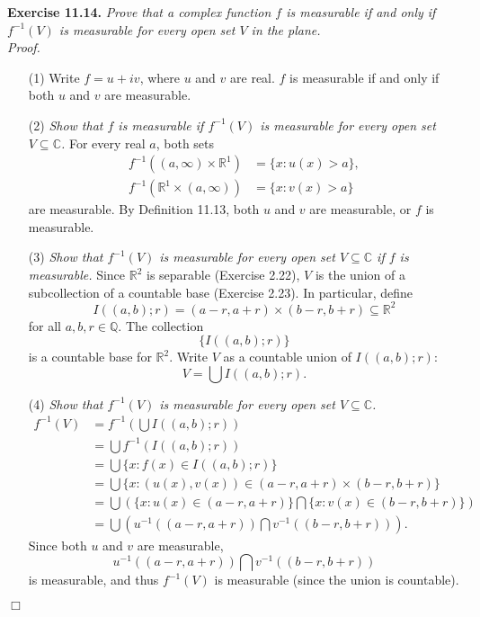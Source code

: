 \documentclass{article}
\begin{document}



\textbf{Exercise 11.14.}
\emph{Prove that a complex function $f$ is measurable
if and only if $f^{-1}(V)$ is measurable for every open set $V$ in the plane.} \\

\emph{Proof.}
\begin{enumerate}
\item[(1)]
  Write $f=u+iv$, where $u$ and $v$ are real.
  $f$ is measurable if and only if both $u$ and $v$ are measurable.

\item[(2)]
  \emph{Show that $f$ is measurable
  if $f^{-1}(V)$ is measurable for every open set $V \subseteq \mathbb{C}$.}
  For every real $a$,
  both sets
  \begin{align*}
    f^{-1}((a,\infty) \times \mathbb{R}^1) &= \{ x : u(x) > a \}, \\
    f^{-1}(\mathbb{R}^1 \times (a,\infty)) &= \{ x : v(x) > a \}
  \end{align*}
  are measurable.
  By Definition 11.13, both $u$ and $v$ are measurable, or $f$ is measurable.

\item[(3)]
  \emph{Show that $f^{-1}(V)$ is measurable for every open set $V \subseteq \mathbb{C}$
  if $f$ is measurable.}
  Since $\mathbb{R}^2$ is separable (Exercise 2.22),
  $V$ is the union of a subcollection of a countable base (Exercise 2.23).
  In particular,
  define
  \[
    I((a,b);r)
    = (a-r,a+r) \times (b-r,b+r)
    \subseteq \mathbb{R}^2
  \]
  for all $a, b, r \in \mathbb{Q}$.
  The collection
  \[
    \{ I((a,b);r) \}
  \]
  is a countable base for $\mathbb{R}^2$.
  Write $V$ as a countable union of $I((a,b);r)$:
  \[
    V = \bigcup I((a,b);r).
  \]

\item[(4)]
  \emph{Show that $f^{-1}(V)$ is measurable for every open set $V \subseteq \mathbb{C}$.}
  \begin{align*}
    f^{-1}(V)
    &= f^{-1} \left( \bigcup I((a,b);r) \right) \\
    &= \bigcup f^{-1}(I((a,b);r)) \\
    &= \bigcup \{ x : f(x) \in I((a,b);r) \} \\
    &= \bigcup \{ x : (u(x), v(x)) \in (a-r,a+r) \times (b-r,b+r) \} \\
    &= \bigcup \left( \{ x : u(x) \in (a-r,a+r) \} \bigcap \{ x : v(x) \in (b-r,b+r) \} \right) \\
    &= \bigcup \left( u^{-1}((a-r,a+r)) \bigcap v^{-1}((b-r,b+r)) \right).
  \end{align*}
  Since both $u$ and $v$ are measurable,
  \[
    u^{-1}((a-r,a+r)) \bigcap v^{-1}((b-r,b+r))
  \]
  is measurable, and thus $f^{-1}(V)$ is measurable (since the union is countable).
\end{enumerate}
$\Box$ \\\\
\end{document}
